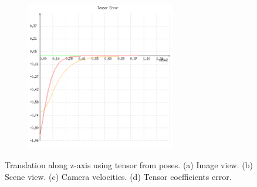 \begin{figure}[ht!]
\begin{mdframed}[linecolor=black!30,backgroundcolor=black!5]
\begin{subfigure}{.48\linewidth}
    \caption{}
    \label{fig:ex2pvelocity}
  \end{subfigure}
  \begin{subfigure}{.48\linewidth}
    \centering
    \includegraphics[width=65mm]{figures/plots/ex2perror.png}
    \caption{}
    \label{fig:ex2perror}
  \end{subfigure}
  \caption{Translation along z-axis using tensor from poses. (a) Image view. (b) Scene view. (c) Camera velocities. (d) Tensor coefficients error.}
  \label{fig:ex2p}
\end{mdframed}
\end{figure}

